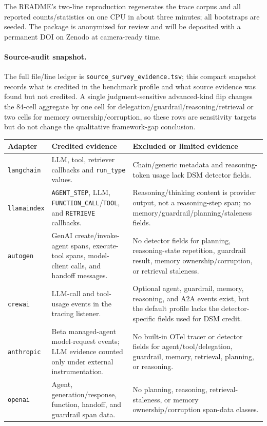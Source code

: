 \documentclass[a4paper,UKenglish,cleveref,autoref,thm-restate]{lipics-v2021}
\begin{document}
\noindent
The README's two-line reproduction regenerates the trace corpus and
all reported counts/statistics on one CPU in about three minutes; all
bootstraps are seeded. The package is anonymized for review and will
be deposited with a permanent DOI on Zenodo at camera-ready time.

\paragraph*{Source-audit snapshot.}
The full file/line ledger is \texttt{source\_survey\_evidence.tsv};
this compact snapshot records what is credited in the benchmark profile
and what source evidence was found but not credited. A single
judgment-sensitive advanced-kind flip changes the 84-cell aggregate by
one cell for delegation/guardrail/reasoning/retrieval or two cells for
memory ownership/corruption, so these rows are sensitivity targets but
do not change the qualitative framework-gap conclusion.

\begin{center}
\scriptsize
\setlength{\tabcolsep}{3pt}
\begin{tabular}{p{}p{}p{}}
\toprule
Adapter & Credited evidence & Excluded or limited evidence \\
\midrule
\texttt{langchain} & LLM, tool, retriever callbacks and
\texttt{run\_type} values. & Chain/generic metadata and reasoning-token
usage lack DSM detector fields. \\
\texttt{llamaindex} & \texttt{AGENT\_STEP}, LLM,
\texttt{FUNCTION\_CALL}/\texttt{TOOL}, and \texttt{RETRIEVE}
callbacks. & Reasoning/thinking content is provider output, not a
reasoning-step span; no memory/guardrail/planning/staleness fields. \\
\texttt{autogen} & GenAI create/invoke-agent spans, execute-tool
spans, model-client calls, and handoff messages. & No detector fields
for planning, reasoning-state repetition, guardrail result, memory
ownership/corruption, or retrieval staleness. \\
\texttt{crewai} & LLM-call and tool-usage events in the tracing
listener. & Optional agent, guardrail, memory, reasoning, and A2A events
exist, but the default profile lacks the detector-specific fields used
for DSM credit. \\
\texttt{anthropic} & Beta managed-agent model-request events; LLM
evidence counted only under external instrumentation. & No built-in OTel
tracer or detector fields for agent/tool/delegation, guardrail, memory,
retrieval, planning, or reasoning. \\
\texttt{openai} & Agent, generation/response, function, handoff, and
guardrail span data. & No planning, reasoning, retrieval-staleness, or
memory ownership/corruption span-data classes. \\
\bottomrule
\end{tabular}
\end{center}



\end{document}
